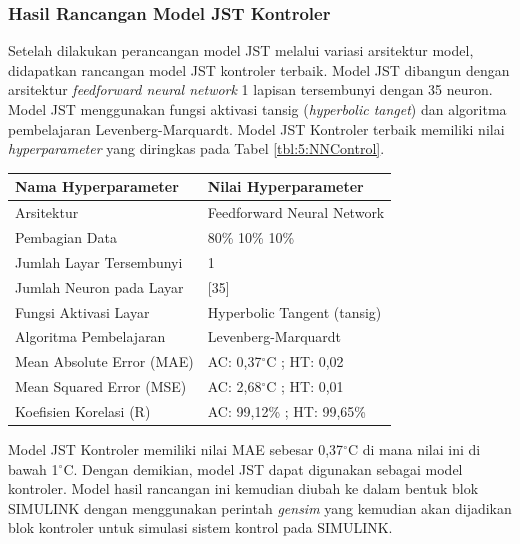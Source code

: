 \documentclass[a4paper,10pt]{article}
\makeatletter
\newenvironment{body}{\begin{multicols}{2}}{\end{multicols}}
\renewenvironment{table}
{\def\@captype{table}%
	\captionsetup{format=plain,labelsep=newline,font=footnotesize,textfont=sc,justification=centering}%
	\fontsize{8}{8}\selectfont
}
{}
\makeatother
\begin{document}
\begin{body}
		\subsubsection{Hasil Rancangan Model JST Kontroler}
		Setelah dilakukan perancangan model JST melalui variasi arsitektur model, didapatkan rancangan model JST kontroler terbaik. Model JST dibangun dengan arsitektur \textit{feedforward neural network} 1 lapisan tersembunyi dengan 35 neuron. Model JST menggunakan fungsi aktivasi tansig (\textit{hyperbolic tanget}) dan algoritma pembelajaran Levenberg-Marquardt. Model JST Kontroler terbaik memiliki nilai \textit{hyperparameter} yang diringkas pada Tabel \ref{tbl:5:NNControl}.
		
		\begin{table}
			\centering
			\caption{Tabel Rancangan Kontroler JST (\textit{NN Inverse Model})}
			\label{tbl:5:NNControl}
			\begin{tabularx}{\linewidth}{XX}\toprule
				\textbf{Nama Hyperparameter} & \textbf{Nilai Hyperparameter} \\ \toprule
				Arsitektur & Feedforward Neural Network \\ \midrule
				Pembagian Data & 80\% 10\% 10\% \\ \midrule 
				Jumlah Layar Tersembunyi & 1 \\ \midrule
				Jumlah Neuron pada Layar & [35] \\ \midrule
				Fungsi Aktivasi Layar & Hyperbolic Tangent (tansig) \\ \midrule
				Algoritma Pembelajaran & Levenberg-Marquardt \\ \midrule
				Mean Absolute Error (MAE) & AC: 0,37$^\circ$C ; HT: 0,02\\ \midrule
				Mean Squared Error (MSE) & AC: 2,68$^\circ$C ; HT: 0,01\\ \midrule
				Koefisien Korelasi (R) & AC: 99,12\% ; HT: 99,65\% \\ \bottomrule
			\end{tabularx}
		\end{table}
	
		\vspace{1mm}
		
		Model JST Kontroler memiliki nilai MAE sebesar 0,37$^\circ$C di mana nilai ini di bawah 1$^\circ$C. Dengan demikian, model JST dapat digunakan sebagai model kontroler. Model hasil rancangan ini kemudian diubah ke dalam bentuk blok SIMULINK dengan menggunakan perintah \textit{gensim} yang kemudian akan dijadikan blok kontroler untuk simulasi sistem kontrol pada SIMULINK.
		

\end{body}
\end{document}
